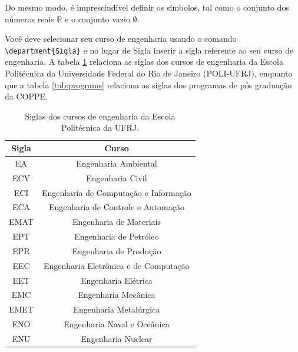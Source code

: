 \documentclass[grad,numbers]{coppe}
\begin{document}
  Do mesmo modo, é imprescindível definir os símbolos, tal como o
  conjunto dos números reais $\mathbb{R}$ e o conjunto vazio $\emptyset$.
  
  Você deve selecionar seu curso de engenharia usando o comando \texttt{\textbackslash department\{Sigla\}} e no lugar de Sigla inserir a sigla referente ao seu curso de engenharia. A tabela \ref{tab:courses} relaciona as siglas dos cursos de engenharia da Escola Politécnica da Universidade Federal do Rio de Janeiro (POLI-UFRJ), enquanto que a tabela \ref{tab:programs} relaciona as siglas dos programas de pós graduação da COPPE.
  
  
  \begin{table}[h]
    \caption{Siglas dos cursos de engenharia da Escola Politécnica da UFRJ.}
    \label{tab:courses}
    \centering
    {\footnotesize
    \begin{tabular}{|c|c|}
    	\hline
    	Sigla &                 Curso                 \\ \hline
    	 EA   &         Engenharia Ambiental          \\
    	 ECV  &           Engenharia Civil            \\
    	 ECI  & Engenharia de Computação e Informação \\
    	 ECA  &  Engenharia de Controle e Automação   \\
    	EMAT  &        Engenharia de Materiais        \\
    	 EPT  &        Engenharia de Petróleo         \\
    	 EPR  &        Engenharia de Produção         \\
    	 EEC  & Engenharia Eletrônica e de Computação \\
    	 EET  &          Engenharia Elétrica          \\
    	 EMC  &          Engenharia Mecânica          \\
    	EMET  &        Engenharia Metalúrgica         \\
    	 ENO  &      Engenharia Naval e Oceânica      \\
    	 ENU  &          Engenharia Nuclear           \\ \hline
    \end{tabular}}
    \end{table}
    
\end{document}
